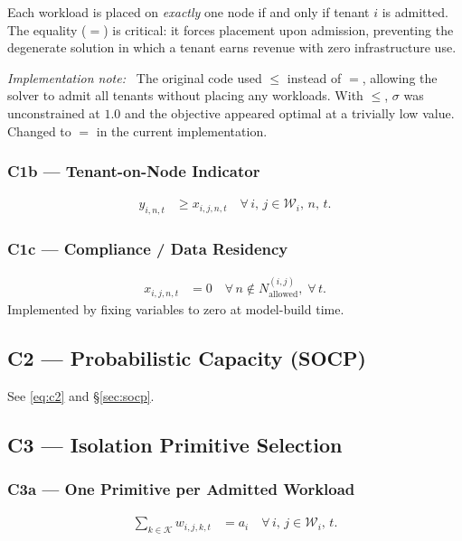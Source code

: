 \documentclass[11pt,a4paper]{article}
\newcommand{\cW}{\mathcal{W}}           %
\newcommand{\cK}{\mathcal{K}}           %
\newenvironment{impl}{\smallskip\noindent\textcolor{fixred}{\textit{Implementation note:\ }}}{\smallskip}
\begin{document}
Each workload is placed on \emph{exactly} one node if and only if tenant
$i$ is admitted.  The equality ($=$) is critical: it forces placement upon
admission, preventing the degenerate solution in which a tenant earns
revenue with zero infrastructure use.

\begin{impl}
  The original code used $\le$ instead of $=$, allowing the solver to
  admit all tenants without placing any workloads.  With $\le$, $\sigma$
  was unconstrained at $1.0$ and the objective appeared optimal at a
  trivially low value.  Changed to $=$ in the current implementation.
\end{impl}

\subsubsection*{C1b --- Tenant-on-Node Indicator}
\begin{align}
  y_{i,n,t} &\ge x_{i,j,n,t}
  \quad \forall\,i,\,j\in\cW_i,\,n,\,t.
  \tag{C1b}
\end{align}

\subsubsection*{C1c --- Compliance / Data Residency}
\begin{align}
  x_{i,j,n,t} &= 0
  \quad \forall\,n\notin N_{\text{allowed}}^{(i,j)},\;\forall\,t.
  \tag{C1c}
\end{align}
Implemented by fixing variables to zero at model-build time.

\subsection{C2 --- Probabilistic Capacity (SOCP)}

See \eqref{eq:c2} and \S\ref{sec:socp}.

\subsection{C3 --- Isolation Primitive Selection}

\subsubsection*{C3a --- One Primitive per Admitted Workload}
\begin{align}
  \sum_{k\in\cK} w_{i,j,k,t} &= a_i
  \quad \forall\,i,\,j\in\cW_i,\,t.
  \tag{C3a}
\end{align}
\end{document}
